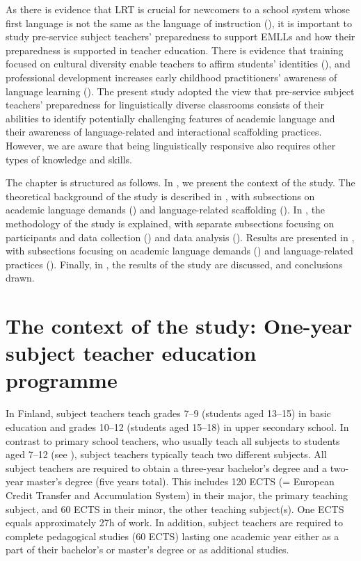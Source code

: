\documentclass[output=paper]{langscibook}
\begin{document}
As there is evidence that LRT is crucial for newcomers to a school system whose first language is not the same as the language of instruction (\citealt{Gibbons2014,LucasVillegas2013,Schleppegrell2002}), it is important to study pre-service subject teachers’ preparedness to support EMLLs and how their preparedness is supported in teacher education. There is evidence that training focused on cultural diversity enable teachers to affirm students’ identities (\citealt{KimanenEtAl2019}), and professional development increases early childhood practitioners’ awareness of language learning (\citealt{Kirsch2018-1}). The present study adopted the view that pre-service subject teachers’ preparedness for linguistically diverse classrooms consists of their abilities to identify potentially challenging features of academic language and their awareness of language-related and interactional scaffolding practices. However, we are aware that being linguistically responsive also requires other types of knowledge and skills.

The chapter is structured as follows. In , we present the context of the study. The theoretical background of the study is described in , with subsections on academic language demands () and language\hyp related scaffolding (). In , the methodology of the study is explained, with separate subsections focusing on participants and data collection () and data analysis (). Results are presented in , with subsections focusing on academic language demands () and language\hyp related practices (). Finally, in , the results of the study are discussed, and conclusions drawn.

\section{The context of the study: One-year subject teacher education programme}\label{sec:heikkola:2}

In Finland, subject teachers teach grades 7–9 (students aged 13–15) in basic education and grades 10–12 (students aged 15–18) in upper secondary school. In contrast to primary school teachers, who usually teach all subjects to students aged 7–12 (see \citealt{chapters/7_alisaari}), subject teachers typically teach two different subjects. All subject teachers are required to obtain a three-year bachelor’s degree and a two-year master’s degree (five years total). This includes 120 ECTS (= European Credit Transfer and Accumulation System) in their major, the primary teaching subject, and 60 ECTS in their minor, the other teaching subject(s). One ECTS equals approximately 27h of work. In addition, subject teachers are required to complete pedagogical studies (60 ECTS) lasting one academic year either as a part of their bachelor’s or master’s degree or as additional studies.
\end{document}
